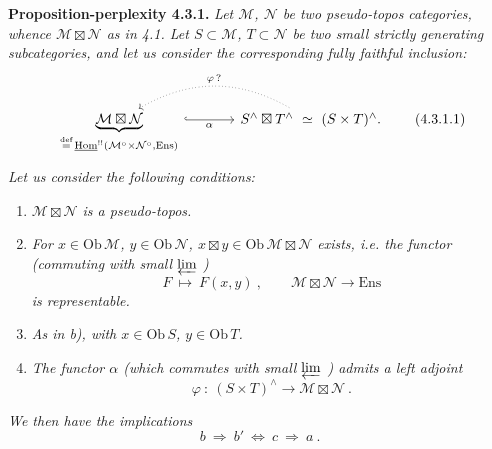 \documentclass[11pt]{article}
\newcommand{\cM}{\mathcal{M}}
\newcommand{\cN}{\mathcal{N}}
\newcommand{\uHom}{\underline{\mathrm{Hom}}}
\newcommand{\Ens}{\mathrm{Ens}}
\newcommand{\Ob}{\mathrm{Ob}\,}
\newcommand{\defeq}{\overset{\text{def}}{=}}
\newcommand{\bt}{\boxtimes}
\begin{document}
\textbf{Proposition-perplexity 4.3.1.} \textit{Let $\cM$, $\cN$ be two pseudo-topos categories, whence $\cM\bt\cN$ as in 4.1. Let $S\subset\cM$, $T\subset\cN$ be two small strictly generating subcategories, and let us consider the corresponding fully faithful inclusion:}
\[
\begin{tikzcd}[column sep=large]
\underbrace{\cM\bt\cN}_{\defeq\, \uHom^{!!}(\cM^{\circ}\times\cN^{\circ},\Ens)} \arrow[r, hook, "\alpha"'] & S^{\wedge}\bt T^{\wedge} \ \simeq\ (S\times T)^{\wedge}. \arrow[l, dotted, bend right, "\varphi\,?"']
\end{tikzcd}
\tag*{(4.3.1.1)}
\]
\textit{Let us consider the following conditions:}
\begin{enumerate}[label={}]
\item[\textit{a)}] \textit{$\cM\bt\cN$ is a pseudo-topos.}
\item[\textit{b)}] \textit{For $x\in\Ob\cM$, $y\in\Ob\cN$, $x\bt y\in\Ob\cM\bt\cN$ exists, i.e. the functor (commuting with small $\varprojlim$ )}
\[
F \ \longmapsto\ F(x,y) \ , \qquad \cM\bt\cN \longrightarrow \Ens
\tag*{(4.3.1.2)}
\]
\textit{is representable.}
\item[\textit{b$'$)}] \textit{As in b), with $x\in\Ob S$, $y\in\Ob T$.}
\item[\textit{c)}] \textit{The functor $\alpha$ (which commutes with small $\varprojlim$ ) admits a left adjoint}
\[
\varphi \ :\ (S\times T)^{\wedge} \longrightarrow \cM\bt\cN \ .
\]
\end{enumerate}
\textit{We then have the implications}
\[
b \ \Longrightarrow\ b' \ \Longleftrightarrow\ c \ \Longrightarrow\ a \ .
\tag*{(4.3.1.3)}
\]
\end{document}

